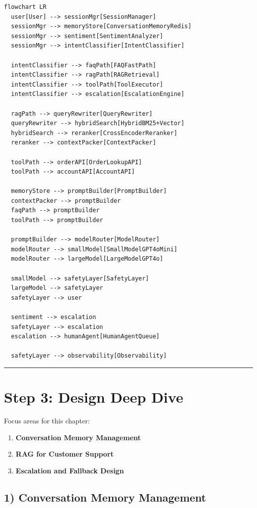 \begin{verbatim}
flowchart LR
  user[User] --> sessionMgr[SessionManager]
  sessionMgr --> memoryStore[ConversationMemoryRedis]
  sessionMgr --> sentiment[SentimentAnalyzer]
  sessionMgr --> intentClassifier[IntentClassifier]

  intentClassifier --> faqPath[FAQFastPath]
  intentClassifier --> ragPath[RAGRetrieval]
  intentClassifier --> toolPath[ToolExecutor]
  intentClassifier --> escalation[EscalationEngine]

  ragPath --> queryRewriter[QueryRewriter]
  queryRewriter --> hybridSearch[HybridBM25+Vector]
  hybridSearch --> reranker[CrossEncoderReranker]
  reranker --> contextPacker[ContextPacker]

  toolPath --> orderAPI[OrderLookupAPI]
  toolPath --> accountAPI[AccountAPI]

  memoryStore --> promptBuilder[PromptBuilder]
  contextPacker --> promptBuilder
  faqPath --> promptBuilder
  toolPath --> promptBuilder

  promptBuilder --> modelRouter[ModelRouter]
  modelRouter --> smallModel[SmallModelGPT4oMini]
  modelRouter --> largeModel[LargeModelGPT4o]

  smallModel --> safetyLayer[SafetyLayer]
  largeModel --> safetyLayer
  safetyLayer --> user

  sentiment --> escalation
  safetyLayer --> escalation
  escalation --> humanAgent[HumanAgentQueue]

  safetyLayer --> observability[Observability]
\end{verbatim}

\bigskip\hrule\bigskip

\section*{Step 3: Design Deep Dive}

Focus areas for this chapter:

\begin{enumerate}
  \item \textbf{Conversation Memory Management}
  \item \textbf{RAG for Customer Support}
  \item \textbf{Escalation and Fallback Design}
\end{enumerate}

\subsection*{1) Conversation Memory Management}

